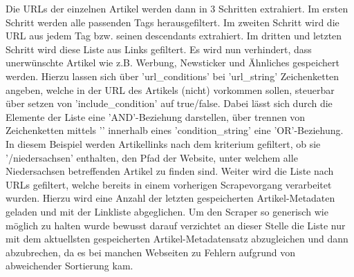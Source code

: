 \documentclass[12pt,oneside,a4paper,parskip]{scrbook}
\begin{document}
Die URLs der einzelnen Artikel werden dann in 3 Schritten extrahiert. \newline
Im ersten Schritt werden alle passenden Tags herausgefiltert. \newline
Im zweiten Schritt wird die URL aus jedem Tag bzw. seinen descendants extrahiert. \newline
Im dritten und letzten Schritt wird diese Liste aus Links gefiltert. Es wird nun verhindert, dass unerwünschte Artikel wie z.B. Werbung, Newsticker und Ähnliches gespeichert werden. Hierzu lassen sich über 'url\_conditions' bei 'url\_string' Zeichenketten angeben, welche in der URL des Artikels (nicht) vorkommen sollen, steuerbar über setzen von 'include\_condition' auf true/false. Dabei lässt sich durch die Elemente der Liste eine 'AND'-Beziehung darstellen, über trennen von Zeichenketten mittels '\textbar' innerhalb eines 'condition\_string' eine 'OR'-Beziehung. In diesem Beispiel werden Artikellinks nach dem kriterium gefiltert, ob sie '/niedersachsen' enthalten, den Pfad der Website, unter welchem alle Niedersachsen betreffenden Artikel zu finden sind. \newline
Weiter wird die Liste nach URLs gefiltert, welche bereits in einem vorherigen Scrapevorgang verarbeitet wurden. Hierzu wird eine Anzahl der letzten gespeicherten Artikel-Metadaten geladen und mit der Linkliste abgeglichen. Um den Scraper so generisch wie möglich zu halten wurde bewusst darauf verzichtet an dieser Stelle die Liste nur mit dem aktuellsten gespeicherten Artikel-Metadatensatz abzugleichen und dann abzubrechen, da es bei manchen Webseiten zu Fehlern aufgrund von abweichender Sortierung kam.
\pagebreak
\end{document}
